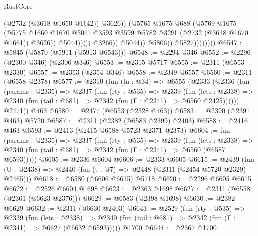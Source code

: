 \begin{lexlean}{RustCore}
\begin{coremodule}
                                            (@2732 (@3618 @1650 @1642))
                                            @3626))
                                        (@5765
                                          @1675
                                          @688
                                          (@5769
                                            @1675
                                            (@5775
                                              @1660
                                              @1670
                                              @5041
                                              @3593
                                              @3599
                                              @5782
                                              @3291
                                              (@2732 (@3618 @1670 @1661))
                                              @3626))
                                          @5044)))))
                                @3266))
                            @5044))
                        @5806))
                    @5827))))))))
@6547 := @5845 (@5870 (@5911 (@5913 @6543)))
@6548 := @2294 @346
@6552 := @2296 (@2300 @346) (@2306 @346)
@6553 := @2315 @5717
@6555 := @2311 (@6553 @2330)
@6557 := @2353 (@2354 @346)
@6558 := @2349 @6557
@6560 := @2311 (@6558 @2378)
@6577 := @2310
    (fun (fn : @34) =>
    @6555
      (@2333
        (@2336
          (fun (params : @2335) =>
          @2337
            (fun (rty : @535) =>
            @2339
              (fun (lets : @2338) =>
              @2340 (fun (tail : @681) => @2342 (fun (Γ : @2341) => @6560 @2425))))))
        @2471))
    @463
@6580 := @2477 (@6553 (@2328 @463))
@6583 := @2390 (@2391 @463) @5720
@6587 := @2311 (@2382 (@6583 @2399) @2403)
@6588 := @2416 @463
@6593 := @2413 (@2415 @6588 @5723 @2371 @2373)
@6604 := fun (params : @2335) =>
  @2337
    (fun (rty : @535) =>
    @2339
      (fun (lets : @2338) =>
      @2340 (fun (tail : @681) => @2342 (fun (Γ : @2341) => @6560 (@6587 @6593)))))
@6605 := @2336 @6604
@6606 := @2333 @6605
@6615 := @2439 (fun (U : @2438) => @2440 (fun (t : @7) => @2448 (@2311 (@2454 @5720 @2329) @2465)))
@6618 := @6580 (@6606 @6615) @5718
@6620 := @2296 @6605 @6615
@6622 := @2526 @6604 @1698
@6623 := @2363 @1698
@6627 := @2311 (@6558 (@2361 (@6623 @2376)))
@6629 := @6583 (@2398 @1698)
@6630 := @2382 @6629
@6632 := @2311 (@6630 @2403)
@6643 := @2529
    (fun (rty : @535) =>
    @2339
      (fun (lets : @2338) =>
      @2340 (fun (tail : @681) => @2342 (fun (Γ : @2341) => @6627 (@6632 @6593)))))
    @1700
@6644 := @2367 @1700

\end{coremodule}
\end{lexlean}
